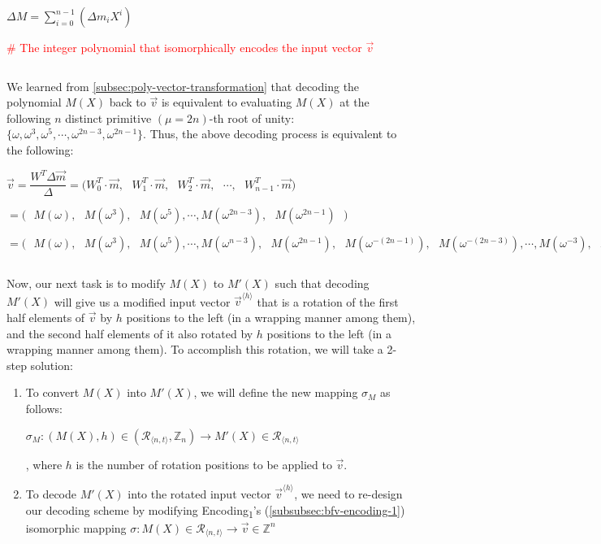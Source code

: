 $\Delta M = \sum\limits_{i=0}^{n-1} ( \Delta m_i  X^i)$ 

\textcolor{red}{\# The integer polynomial that isomorphically encodes the input vector $\vec{v}$}


$ $

We learned from \autoref{subsec:poly-vector-transformation} that decoding the polynomial $M(X)$ back to $\vec{v}$ is equivalent to evaluating $M(X)$ at the following $n$ distinct primitive $(\mu=2n)$-th root of unity: $\{\omega, \omega^3, \omega^5, \cdots, \omega^{2n-3}, \omega^{2n-1} \}$. Thus, the above decoding process is equivalent to the following:

$\vec{v} = \dfrac{W^T \Delta \vec{m}}{\Delta} = \bm{(}W^T_0\cdot \vec{m}, \text{ } W^T_1\cdot \vec{m}, \text{ } W^T_2\cdot \vec{m}, \text{ } \cdots, \text{ } W^T_{n-1}\cdot \vec{m}\bm{)}$  

$= \bm{(} \text{ } M(\omega), \text{ } M(\omega^3), \text{ } M(\omega^5), \cdots, M(\omega^{2n-3}), \text{ } M(\omega^{2n-1}) \text{ } \bm{)}$


$= \bm{(} \text{ } M(\omega), \text{ } M(\omega^3), \text{ } M(\omega^5), \cdots, M(\omega^{n-3}), \text{ } M(\omega^{2n-1}), \text{ } M(\omega^{-(2n-1)}), \text{ } M(\omega^{-(2n-3)}), \cdots, M(\omega^{-3}), \text{ } M(\omega{-1}) \text{ } \bm{)}$ 





$ $

Now, our next task is to modify $M(X)$ to $M'(X)$ such that decoding $M'(X)$ will give us a modified input vector $\vec{v}^{\langle h \rangle}$ that is a rotation of the first half elements of $\vec{v}$ by $h$ positions to the left (in a wrapping manner among them), and the second half elements of it also rotated by $h$ positions to the left (in a wrapping manner among them). To accomplish this rotation, we will take a 2-step solution: 

\begin{enumerate}[leftmargin=3\parindent]
\item To convert $M(X)$ into $M'(X)$, we will define the new mapping $\sigma_M$ as follows: 

$\sigma_M : (M(X), h) \in (\mathcal{R}_{\langle n, t \rangle}, \mathbb{Z}_{n}) \longrightarrow M'(X) \in \mathcal{R}_{\langle n, t \rangle}$

, where $h$ is the number of rotation positions to be applied to $\vec{v}$.
\item To decode $M'(X)$ into the rotated input vector $\vec{v}^{\langle h \rangle}$, we need to re-design our decoding scheme by modifying \textsf{Encoding\textsubscript{1}}'s (\autoref{subsubsec:bfv-encoding-1}) isomorphic mapping $\sigma : M(X) \in \mathcal{R}_{\langle n, t \rangle} \longrightarrow \vec{v} \in \mathbb{Z}^n$ 
\end{enumerate}

